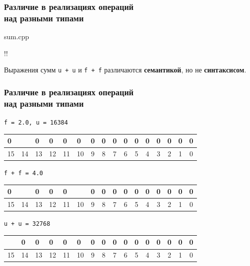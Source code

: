 \documentclass[compress, 8pt, aspectratio=169]{beamer}
\newenvironment{sixteenbit}{%
    \begin{center}
        \begin{tabular}{ |m{0.2cm}|m{0.2cm}|m{0.2cm}|m{0.2cm}|m{0.2cm}|m{0.2cm}|m{0.2cm}|m{0.2cm}|m{0.2cm}|m{0.2cm}|m{0.2cm}|m{0.2cm}|m{0.2cm}|m{0.2cm}|m{0.2cm}|m{0.2cm}|  }
            \hline
}{
        \hline
        \multicolumn{1}{c}{\color{gray}\tiny{15}} &
        \multicolumn{1}{c}{\color{gray}\tiny{14}} &
        \multicolumn{1}{c}{\color{gray}\tiny{13}} &
        \multicolumn{1}{c}{\color{gray}\tiny{12}} &
        \multicolumn{1}{c}{\color{gray}\tiny{11}} &
        \multicolumn{1}{c}{\color{gray}\tiny{10}} &
        \multicolumn{1}{c}{\color{gray}\tiny{9}} &
        \multicolumn{1}{c}{\color{gray}\tiny{8}} &
        \multicolumn{1}{c}{\color{gray}\tiny{7}} &
        \multicolumn{1}{c}{\color{gray}\tiny{6}} &
        \multicolumn{1}{c}{\color{gray}\tiny{5}} &
        \multicolumn{1}{c}{\color{gray}\tiny{4}} &
        \multicolumn{1}{c}{\color{gray}\tiny{3}} &
        \multicolumn{1}{c}{\color{gray}\tiny{2}} &
        \multicolumn{1}{c}{\color{gray}\tiny{1}} &
        \multicolumn{1}{c}{\color{gray}\tiny{0}} \\
        \end{tabular}
    \end{center}
}
\begin{document}
\begin{frame}[fragile]

    \frametitle{Различие в реализациях операций \\ над разными типами}

        {sum.cpp}

    \begin{terminalwindow}
!!
    \end{terminalwindow}

    Выражения сумм \verb|u + u| и \verb|f + f| различаются
    \textbf{семантикой}, но не \textbf{синтаксисом}.

\end{frame}

\begin{frame}[fragile]

    \frametitle{Различие в реализациях операций \\ над разными типами}

    \verb|f = 2.0, u = 16384|

    \begin{sixteenbit}
        0 & \cellcolor{gray}{1} & 0 & 0 & 0 & 0 & 0 & 0 & 0 & 0 & 0 & 0 & 0 & 0 & 0 & 0 \\
    \end{sixteenbit}

    \verb|f + f = 4.0|

    \begin{sixteenbit}
        0 & \cellcolor{gray}{1} & 0 & 0 & 0 & \cellcolor{gray}{1} & 0 & 0 & 0 & 0 & 0 & 0 & 0 & 0 & 0 & 0 \\
    \end{sixteenbit}

    \verb|u + u = 32768|

    \begin{sixteenbit}
        \cellcolor{gray}{1} & 0 & 0 & 0 & 0 & 0 & 0 & 0 & 0 & 0 & 0 & 0 & 0 & 0 & 0 & 0 \\
    \end{sixteenbit}

\end{frame}
\end{document}
